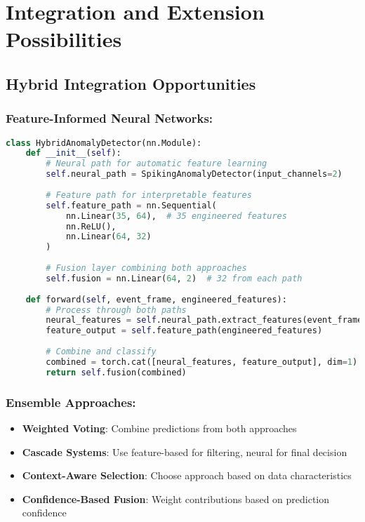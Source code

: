 \documentclass[11pt,a4paper]{article}
\begin{document}
\section{Integration and Extension Possibilities}

\subsection{Hybrid Integration Opportunities}

\subsubsection{Feature-Informed Neural Networks:}
\begin{lstlisting}[language=Python, caption=Hybrid Integration Example]
class HybridAnomalyDetector(nn.Module):
    def __init__(self):
        # Neural path for automatic feature learning
        self.neural_path = SpikingAnomalyDetector(input_channels=2)
        
        # Feature path for interpretable features
        self.feature_path = nn.Sequential(
            nn.Linear(35, 64),  # 35 engineered features
            nn.ReLU(),
            nn.Linear(64, 32)
        )
        
        # Fusion layer combining both approaches
        self.fusion = nn.Linear(64, 2)  # 32 from each path
    
    def forward(self, event_frame, engineered_features):
        # Process through both paths
        neural_features = self.neural_path.extract_features(event_frame)
        feature_output = self.feature_path(engineered_features)
        
        # Combine and classify
        combined = torch.cat([neural_features, feature_output], dim=1)
        return self.fusion(combined)
\end{lstlisting}

\subsubsection{Ensemble Approaches:}
\begin{itemize}
    \item \textbf{Weighted Voting}: Combine predictions from both approaches
    \item \textbf{Cascade Systems}: Use feature-based for filtering, neural for final decision
    \item \textbf{Context-Aware Selection}: Choose approach based on data characteristics
    \item \textbf{Confidence-Based Fusion}: Weight contributions based on prediction confidence
\end{itemize}
\end{document}
